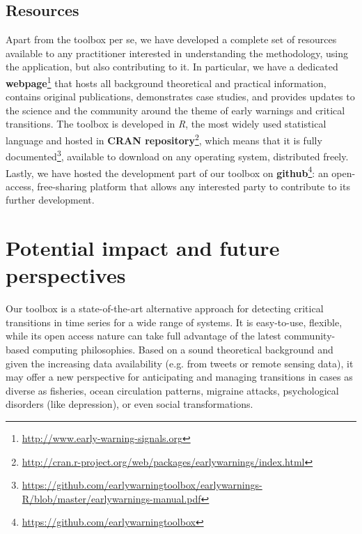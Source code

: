 \documentclass[12pt,a4paper,final]{article}
\begin{document}
\subsection{Resources} 
\label{sec:resources}
Apart from the toolbox per se, we have developed a complete set of resources available to any practitioner interested in understanding the methodology, using the application, but also contributing to it. In particular, we have a dedicated  \textbf{webpage}\footnote{\url{http://www.early-warning-signals.org}} that hosts all background theoretical and practical information, contains original publications, demonstrates case studies, and provides updates to the science and the community around the theme of early warnings and critical transitions. The toolbox is developed in \textit{R}, the most widely used statistical language and hosted in \textbf{CRAN repository}\footnote{\url{http://cran.r-project.org/web/packages/earlywarnings/index.html}}, which means that it is fully documented\footnote{\url{https://github.com/earlywarningtoolbox/earlywarnings-R/blob/master/earlywarnings-manual.pdf}}, available to download on any operating system, distributed freely. Lastly, we have hosted the development part of our toolbox on \textbf{github}\footnote{\url{https://github.com/earlywarningtoolbox}}: an open-access, free-sharing platform that allows any interested party to contribute to its further development.


\section{Potential impact and future perspectives}
Our toolbox is a state-of-the-art alternative approach for detecting critical transitions in time series for a wide range of systems. It is easy-to-use, flexible, while its open access nature can take full advantage of the latest community-based computing philosophies. Based on a sound theoretical background and given the increasing data availability (e.g. from tweets or remote sensing data), it may offer a new perspective for anticipating and managing transitions in cases as diverse as fisheries, ocean circulation patterns, migraine attacks, psychological disorders (like depression), or even social transformations.
\end{document}
